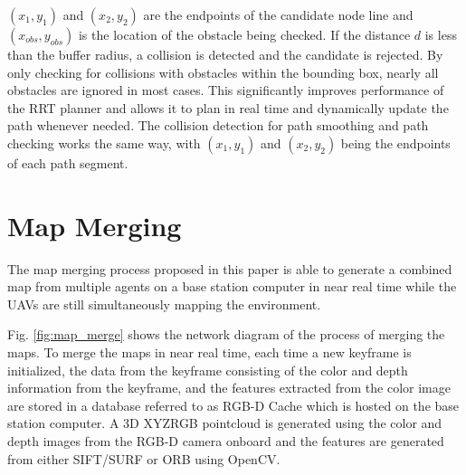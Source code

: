 \documentclass[letterpaper, 10 pt, conference]{ieeeconf}  %
\newcommand{\todo}[1]{{\color{blue}[TODO: #1]}}
\begin{document}
$(x_1,y_1)$ and $(x_2,y_2)$ are the endpoints of the candidate node line and $(x_{\mathit{obs}},y_{\mathit{obs}})$ is the location of the obstacle being checked. If the distance $d$ is less than the buffer radius, a collision is detected and the candidate is rejected. By only checking for collisions with obstacles within the bounding box, nearly all obstacles are ignored in most cases. This significantly improves performance of the RRT planner and allows it to plan in real time and dynamically update the path whenever needed. The collision detection for path smoothing and path checking works the same way, with $(x_1,y_1)$ and $(x_2,y_2)$ being the endpoints of each path segment.

%
%
%
%

\section{Map Merging}\label{merge}

The map merging process proposed in this paper is able to generate a combined map from multiple agents on a base station computer in near real time while the UAVs are still simultaneously mapping the environment.

Fig. \ref{fig:map_merge} shows the network diagram of the process of merging the maps. To merge the maps in near real time, each time a new keyframe is initialized, the data from the keyframe consisting of the color and depth information from the keyframe, and the features extracted from the color image are stored in a database referred to as RGB-D Cache which is hosted on the base station computer. A 3D XYZRGB pointcloud is generated using the color and depth images from the RGB-D camera onboard and the features are generated from either SIFT/SURF or ORB using OpenCV.
\end{document}
